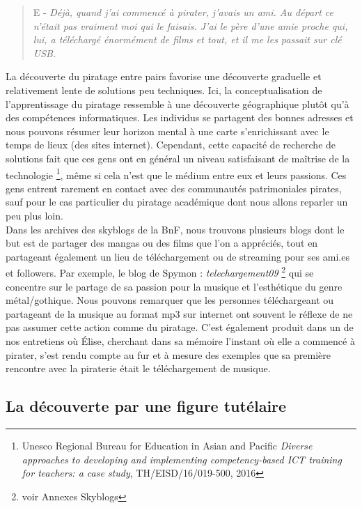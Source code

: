 \begin{quote}
    E - \textit{Déjà, quand j'ai commencé à pirater, j'avais un ami. Au départ ce n'était pas vraiment moi qui le faisais. J'ai le père d'une amie proche qui, lui, a téléchargé énormément de films et tout, et il me les passait sur clé USB. }
\end{quote}

La découverte du piratage entre pairs favorise une découverte graduelle et relativement lente de solutions peu techniques. Ici, la conceptualisation de l'apprentissage du piratage ressemble à une découverte géographique plutôt qu'à des compétences informatiques. Les individus se partagent des \og bonnes adresses \fg et nous pouvons résumer leur horizon mental à une carte s'enrichissant avec le temps de lieux (des sites internet). Cependant, cette capacité de recherche de solutions fait que ces gens ont en général un niveau satisfaisant de maîtrise de la technologie \footnote{Unesco Regional Bureau for Education in Asian and Pacific \textit{Diverse approaches to developing and implementing competency-based ICT training for teachers: a case study}, TH/EISD/16/019-500, 2016}, même si cela n'est que le médium entre eux et leurs passions. Ces gens entrent rarement en contact avec des communautés patrimoniales pirates, sauf pour le cas particulier du piratage académique dont nous allons reparler un peu plus loin.\\

Dans les archives des skyblogs de la BnF, nous trouvons plusieurs blogs dont le but est de partager des mangas ou des films que l'on a appréciés, tout en partageant également un lieu de téléchargement ou de streaming pour ses ami.es et followers. Par exemple, le blog de Spymon : \textit{telechargement09} \footnote{voir Annexes Skyblogs} qui se concentre sur le partage de sa passion pour la musique et l'esthétique du genre métal/gothique. Nous pouvons remarquer que les personnes téléchargeant ou partageant de la musique au format mp3 sur internet ont souvent le réflexe de ne pas assumer cette action comme du piratage. C'est également produit dans un de nos entretiens où Élise, cherchant dans sa mémoire l'instant où elle a commencé à pirater, s'est rendu compte au fur et à mesure des exemples que sa première rencontre avec la piraterie était le téléchargement de musique. 

\subsection*{La découverte par une figure tutélaire}

